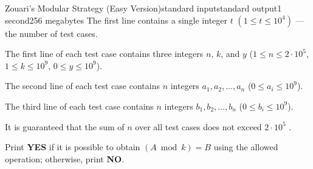 \begin{problem}{Zouari's Modular Strategy (Easy Version)}{standard input}{standard output}{1 second}{256 megabytes}
\InputFile
The first line contains a single integer $t$ $(1 \le t \le 10^4)$ --- the number of test cases.

The first line of each test case contains three integers $n$, $k$, and $y$ ($1 \le n \le 2 \cdot 10^5$, $1 \le k \le 10^9$, $0 \le y \le 10^9$).

The second line of each test case contains $n$ integers $a_1, a_2, \dots, a_n$ ($0 \le a_i \le 10^9$).

The third line of each test case contains $n$ integers $b_1, b_2, \dots, b_n$ ($0 \le b_i \le 10^9$).

It is guaranteed that the sum of $n$ over all test cases does not exceed $2 \cdot 10^5$ .

\OutputFile
Print \textbf{YES} if it is possible to obtain $(A \bmod k) = B$ using the allowed operation; otherwise, print \textbf{NO}.

\Example

\begin{example}
%
\end{example}

\end{problem}

